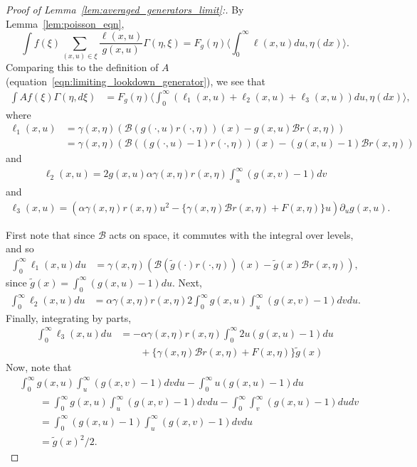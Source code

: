 \documentclass[EJP]{ejpecp} %
\newcommand{\DG}{\mathcal{B}}  %
\newcommand{\lp}{\xi}              %
\begin{document}
\begin{proof}[Proof of Lemma~\ref{lem:averaged_generators_limit}:]
By Lemma~\ref{lem:poisson_eqn},
$$
    \int f(\lp) \sum_{(x,u)\in\lp} \frac{\ell(x,u)}{g(x,u)} \Gamma(\eta, \lp)
    =
    F_g(\eta) \bigg\langle \int_0^\infty \ell(x,u) du , \eta(dx) \bigg\rangle .
$$
Comparing this to the definition of $A$
(equation~\eqref{eqn:limiting_lookdown_generator}),
we see that
\begin{align*}
    \int Af(\lp) \Gamma(\eta,d\lp)
    &=
    F_g(\eta) \bigg\langle
        \int_0^\infty
        (\ell_1(x,u) + \ell_2(x,u) + \ell_3(x,u))
        du, \eta(dx)
    \bigg\rangle ,
\end{align*}
where
\begin{align*}
    \ell_1(x,u)
    &=
    \gamma(x,\eta)\left(
        \DG(g(\cdot,u) r(\cdot,\eta))(x) - g(x,u) \DG r(x,\eta)
    \right) \\
    &=
    \gamma(x,\eta)\left(
        \DG((g(\cdot,u)-1) r(\cdot,\eta))(x) - (g(x,u)-1) \DG r(x,\eta)
    \right)
\end{align*}
and
\begin{align*}
    \ell_2(x,u)
    =
    2 g(x,u) \alpha \gamma(x,\eta) r(x,\eta) \int_u^\infty(g(x,v) - 1)dv
\end{align*}
and
\begin{align*}
    \ell_3(x,u)
    =
    \left( \alpha \gamma(x,\eta)r(x,\eta)u^2 - \{\gamma(x,\eta)\DG r(x,\eta) + F(x,\eta)\} u \right)
    \partial_u g(x,u) .
\end{align*}

First note that since $\DG$ acts on space, it commutes with the integral over levels, and so
\begin{align*}
    \int_0^\infty \ell_1(x,u) du
    &=
    \gamma(x,\eta)\left(
        \DG(\widetilde{g}(\cdot) r(\cdot,\eta))(x) - \widetilde{g}(x) \DG r(x,\eta)
    \right) ,
\end{align*}
since $\widetilde{g}(x) = \int_0^\infty (g(x,u) - 1) du$.
Next,
\begin{align*}
    \int_0^\infty \ell_2(x,u) du
    &=
    \alpha \gamma(x,\eta) r(x,\eta) 2\int_0^\infty g(x,u) \int_u^\infty (g(x,v)-1) dv du .
\end{align*}
Finally, integrating by parts,
\begin{align*}
    \int_0^\infty \ell_3(x,u) du
    &=
    - \alpha \gamma(x,\eta) r(x,\eta) \int_0^\infty 2u(g(x,u) - 1) du
    \\ & \qquad {}
    + \{ \gamma(x,\eta) \DG r(x,\eta) + F(x,\eta) \} \widetilde{g}(x)
\end{align*}
Now, note that
\begin{align*}
&
    \int_0^\infty g(x,u) \int_u^\infty (g(x,v)-1) dv du - \int_0^\infty u(g(x,u)-1)du
\\ & \qquad =
    \int_0^\infty g(x,u) \int_u^\infty (g(x,v)-1) dv du - \int_0^\infty \int_v^\infty (g(x,u) -1) du dv
\\ & \qquad =
    \int_0^\infty (g(x,u)-1) \int_u^\infty (g(x,v)-1) dv du
\\ & \qquad =
    \widetilde{g}(x)^2/2 .
\end{align*}


\end{proof}
\end{document}
